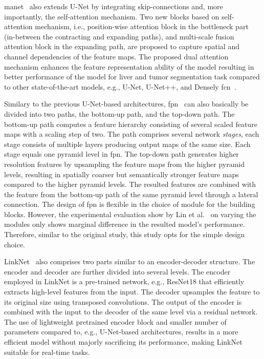 \documentclass[mathematics,article,submit,pdftex,moreauthors]{Definitions/mdpi}
\begin{document}
\ac{manet}~\cite{Fan2020} also extends U-Net by integrating
skip-connections and, more importantly, the self-attention mechanism.
Two new blocks based on self-attention mechanism, i.e., 
position-wise attention block in the bottleneck
part (in-between the contracting and expanding paths),
and multi-scale fusion attention block in the expanding
path, are proposed to capture spatial and channel
dependencies of the feature maps. The proposed dual
attention mechanism enhances the feature representation ability
of the model resulting in better performance
of the model for liver and tumor segmentation
task compared to other state-of-the-art models,
e.g., U-Net, U-Net++, and Densely \ac{fcn}~\cite{Krishna2018}.

Similary to the previous U-Net-based architectures,
\ac{fpn}~\cite{Lin2017} can also basically 
be divided into two paths, the bottom-up path,
and the top-down path. The bottom-up
path computes a feature hierarchy consisting
of several scaled feature maps with a scaling
step of two. The path comprises several network
\textit{stages}, each stage consists of multiple layers
producing output maps of the same size.
Each stage equals one pyramid level in \ac{fpn}.
The top-down path generates higher resolution
features by upsampling the feature maps from
the higher pyramid levels, resulting
in spatially coarser but semantically stronger feature maps
compared to the higher pyramid levels.
The resulted features are combined with
the feature from the bottom-up
path of the same pyramid level through a lateral
connection. The design of \ac{fpn}
is flexible in the choice of module
for the building blocks.
However, the experimental evaluation show by 
Lin et al.~\cite{Lin2017} on varying the modules only
shows marginal difference in the resulted model's
performance. Therefore, similar to the original study,
this study opts for the simple design choice.

LinkNet~\cite{Chaurasia2017} also comprises two parts similar
to an encoder-decoder structure. 
The encoder and decoder are further
divided into several levels.
The encoder employed in LinkNet is a pre-trained
network, e.g., ResNet18 that
efficiently extracts high-level features from
the input. The decoder upsamples the feature
to its original size using transposed
convolutions. The output of the
encoder is combined with the input
to the decoder of the same level via
a residual network. The use of lightweight
pretrained encoder block and smaller
number of parameters compared to, e.g., 
U-Net-based architectures, results 
in a more efficient model without
majorly sacrificing its performance,
making LinkNet suitable for real-time
tasks.
\end{document}

